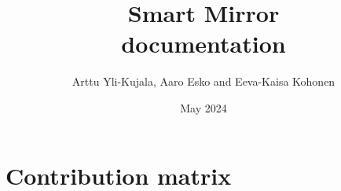 \documentclass{article}
\title{Smart Mirror\\ documentation}
\author{Arttu Yli-Kujala, Aaro Esko and Eeva-Kaisa Kohonen}
\date{May 2024}
\begin{document}
\maketitle

\newpage
\tableofcontents
\newpage

\section{Contribution matrix}
\end{document}

